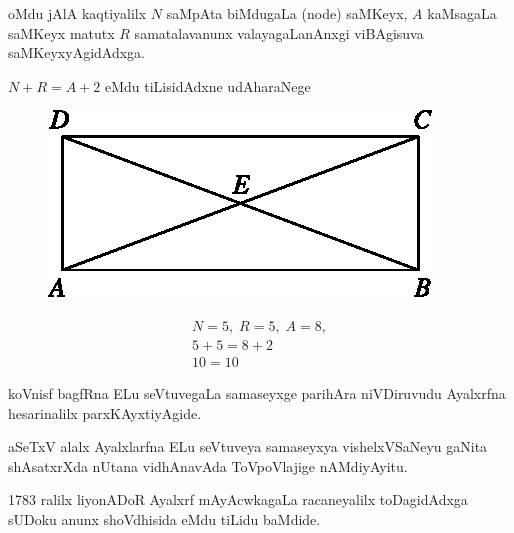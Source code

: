 oMdu jAlA kaqtiyalilx $N$ saMpAta biMdugaLa {\rm (node)} saMKeyx, $A$ kaMsagaLa saMKeyx matutx $R$ samatalavanunx valayagaLanAnxgi viBAgisuva saMKeyxyAgidAdxga.

$N+R=A+2$ eMdu tiLisidAdxne udAharaNege
\begin{figure}[H]
\begin{minipage}[c]{4cm}
\centering
\includegraphics{src/figures/m_149.eps}
\end{minipage}
\qquad\qquad 
\begin{minipage}[c]{4cm}
\begin{gather*}
N = 5, \; R=5, \; A = 8, \\
5+5 = 8+2\\
10 = 10
\end{gather*}
\end{minipage}
\end{figure}

koVnisf bagfRna ELu seVtuvegaLa samaseyxge parihAra niVDiruvudu Ayalxrfna hesarinalilx parxKAyxtiyAgide.

aSeTxV alalx Ayalxlarfna ELu seVtuveya samaseyxya vishelxVSaNeyu gaNita shAsatxrXda nUtana vidhAnavAda ToVpoVlajige nAMdiyAyitu.

{\rm 1783} ralilx liyonADoR Ayalxrf mAyAcwkagaLa racaneyalilx toDagidAdxga sUDoku anunx shoVdhisida eMdu tiLidu baMdide.

